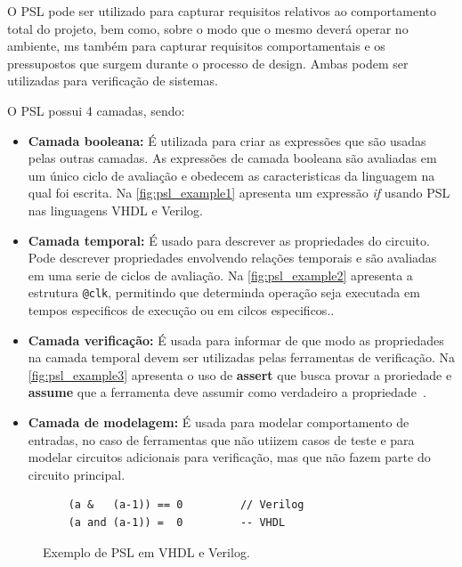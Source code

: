 O PSL pode ser utilizado para capturar requisitos relativos ao comportamento total do projeto, bem como, sobre o modo que o mesmo deverá operar no ambiente, ms também para capturar requisitos comportamentais e os pressupostos que surgem durante o processo de design. Ambas podem ser utilizadas para verificação de sistemas. 

\par
O PSL possui 4 camadas, sendo:
\begin{itemize}
    \item \textbf{Camada booleana:} É utilizada para criar as expressões que são usadas pelas outras camadas. As expressões de camada booleana são avaliadas em um único ciclo de avaliação e obedecem as caracteristicas da linguagem na qual foi escrita. Na \autoref{fig:psl_example1} apresenta um expressão \textit{if} usando PSL nas linguagens VHDL e Verilog\cite{IEEEPSL}.
    \item \textbf{Camada temporal:} É usado para descrever as propriedades do circuito. Pode descrever propriedades envolvendo relações temporais e são avaliadas em uma serie de ciclos de avaliação. Na \autoref{fig:psl_example2} apresenta a estrutura \texttt{@clk}, permitindo que determinda operação seja executada em tempos especificos de execução ou em cilcos especificos.\cite{IEEEPSL}.
    \item \textbf{Camada verificação:} É usada para informar de que modo as propriedades na camada temporal devem ser utilizadas pelas ferramentas de verificação. Na \autoref{fig:psl_example3} apresenta o uso de \textbf{assert} que busca provar a proriedade e \textbf{assume} que a ferramenta deve assumir como verdadeiro a propriedade~\cite{IEEEPSL}.
    \item \textbf{Camada de modelagem:} É usada para modelar comportamento de entradas, no caso de ferramentas que não utiizem casos de teste e para modelar circuitos adicionais para verificação, mas que não fazem parte do circuito principal\cite{IEEEPSL}.
\end{itemize}

\begin{figure}[H]
\caption{\label{fig:psl_example1} Exemplo de PSL em VHDL e Verilog.}
	\begin{center}
    \begin{minipage}{0.7\textwidth}
    \begin{lstlisting}       
    (a &   (a-1)) == 0         // Verilog
    (a and (a-1)) =  0         -- VHDL
    \end{lstlisting}
    \end{minipage}
	\end{center}
\end{figure}

